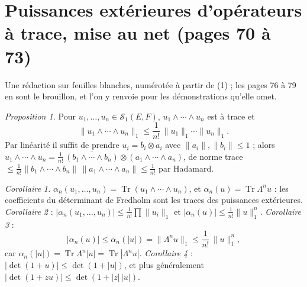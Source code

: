 \documentclass[11pt,a4paper]{article}
\begin{document}
\section*{Puissances extérieures d'opérateurs à trace, mise au net (pages 70 à 73)}

Une rédaction sur feuilles blanches, numérotée à partir de (1) ; les pages
76 à 79 en sont le brouillon, et l'on y renvoie pour les démonstrations
qu'elle omet.

\emph{Proposition 1.} Pour $u_1, \ldots, u_n \in \mathcal{S}_1(E,F)$,
$u_1 \wedge \cdots \wedge u_n$ est à trace et
\[
  \|u_1 \wedge \cdots \wedge u_n\|_1 \leq \frac{1}{n!}\,\|u_1\|_1 \cdots \|u_n\|_1 .
\]
Par linéarité il suffit de prendre $u_i = \bar{b}_i \otimes a_i$ avec
$\|a_i\|, \|b_i\| \leq 1$ ; alors $u_1 \wedge \cdots \wedge u_n = \frac{1}{n!}
\,\overline{(b_1 \wedge \cdots \wedge b_n)} \otimes (a_1 \wedge \cdots \wedge
a_n)$, de norme trace $\leq \frac{1}{n!}\|b_1 \wedge \cdots \wedge b_n\|\,
\|a_1 \wedge \cdots \wedge a_n\| \leq \frac{1}{n!}$ par Hadamard.

\emph{Corollaire 1.} $\alpha_n(u_1, \ldots, u_n) = \operatorname{Tr}(u_1 \wedge
\cdots \wedge u_n)$, et $\alpha_n(u) = \operatorname{Tr}\Lambda^n u$ : les
coefficients du déterminant de Fredholm sont les traces des puissances
extérieures. \emph{Corollaire 2} : $|\alpha_n(u_1, \ldots, u_n)| \leq
\frac{1}{n!}\prod \|u_i\|_1$ et $|\alpha_n(u)| \leq \frac{1}{n!}\|u\|_1^n$.
\emph{Corollaire 3} :
\[
  |\alpha_n(u)| \leq \alpha_n(|u|) = \|\Lambda^n u\|_1 \leq \frac{1}{n!}\,\|u\|_1^n,
\]
car $\alpha_n(|u|) = \operatorname{Tr}\Lambda^n|u| = \operatorname{Tr}|\Lambda^n u|$.
\emph{Corollaire 4} : $|\det(1+u)| \leq \det(1+|u|)$, et plus généralement
$|\det(1+zu)| \leq \det(1+|z|\,|u|)$.
\end{document}
